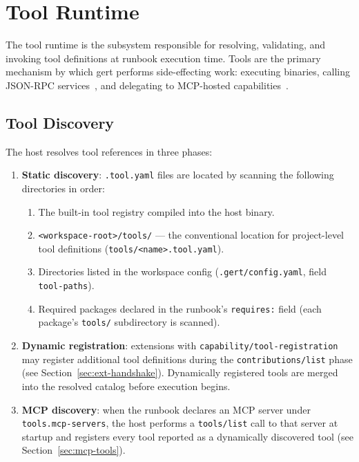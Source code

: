 \chapter{Tool Runtime}
\label{ch:tools}

The tool runtime is the subsystem responsible for resolving, validating, and
invoking tool definitions at runbook execution time.  Tools are the primary
mechanism by which gert performs side-effecting work: executing binaries,
calling JSON-RPC services~\cite{jsonrpc-spec}, and delegating to MCP-hosted capabilities~\cite{mcp-spec}.

\section{Tool Discovery}
\label{sec:tool-discovery}

The host resolves tool references in three phases:

\begin{enumerate}
  \item \textbf{Static discovery}: \texttt{.tool.yaml} files are located by
        scanning the following directories in order:
        \begin{enumerate}
          \item The built-in tool registry compiled into the host binary.
          \item \texttt{<workspace-root>/tools/} — the conventional location for
                project-level tool definitions
                (\texttt{tools/<name>.tool.yaml}).
          \item Directories listed in the workspace config
                (\texttt{.gert/config.yaml}, field \texttt{tool-paths}).
          \item Required packages declared in the runbook's \texttt{requires:}
                field (each package's \texttt{tools/} subdirectory is scanned).
        \end{enumerate}
  \item \textbf{Dynamic registration}: extensions with
        \texttt{capability/tool-registration} may register additional tool
        definitions during the \texttt{contributions/list} phase (see
        Section~\ref{sec:ext-handshake}).  Dynamically registered tools are
        merged into the resolved catalog before execution begins.
  \item \textbf{MCP discovery}: when the runbook declares an MCP server under
        \texttt{tools.mcp-servers}, the host performs a \texttt{tools/list}
        call to that server at startup and registers every tool reported as a
        dynamically discovered tool (see Section~\ref{sec:mcp-tools}).
\end{enumerate}

